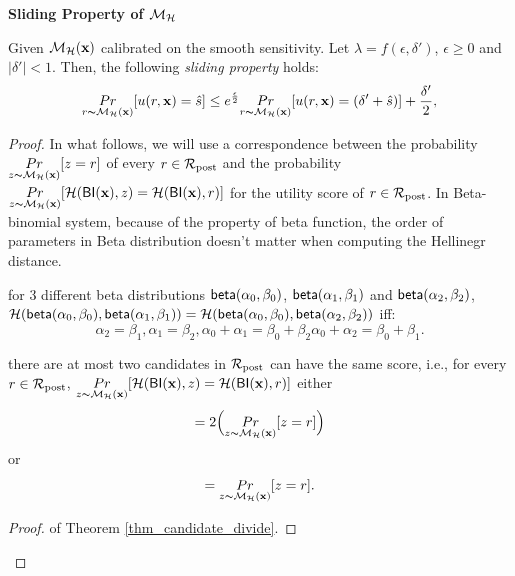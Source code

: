 \documentclass{article}
\begin{document}
\noindent \textbf{Sliding Property of $\mathcal{M}_{\mathcal{H}}$}
\begin{lem}
\label{lem_sliding}
Given $\mathcal{M}_{\mathcal{H}}(\textbf{x})$ calibrated on the smooth sensitivity. Let $\lambda = f(\epsilon,
\delta')$, $\epsilon\geq 0$ and $|\delta'| < 1$. Then, the following \emph{sliding property} holds:
\begin{equation*}
\underset{r \thicksim \mathcal{M}_{\mathcal{H}}(\textbf{x})}{Pr}[u(r,\textbf{x}) = \hat{s}]
\leq
e^{\frac{\epsilon}{2}} \underset{r \thicksim \mathcal{M}_{\mathcal{H}}(\textbf{x})}{Pr}[u(r,\textbf{x}) = (\delta' + \hat{s})] + \frac{\delta'}{2},
\end{equation*}

\end{lem}

\begin{proof}

In what follows, we will use a correspondence between the probability
 $\underset{z \thicksim \mathcal{M}_{\mathcal{H}}(\textbf{x})}{Pr}[z = r]$ of every
 $r\in\mathcal{R}_{\textup{post}}$ and the probability 
 $\underset{z \thicksim \mathcal{M}_{\mathcal{H}}(\textbf{x})}{Pr}[\mathcal{H}(\mathsf{BI}(\textbf{x}),z) =
 \mathcal{H}(\mathsf{BI}(\textbf{x}),r)]$ for the utility score of $r \in \mathcal{R}_{\textup{post}}$. In Beta-binomial system, because of the property of beta function, the order of parameters in Beta distribution doesn't matter when computing the Hellinegr distance. 

 \begin{lem}
 \label{lem_hellinegr_equality}
 for 3 different beta distributions $\mathsf{beta}(\alpha_0, \beta_0)$, $\mathsf{beta}(\alpha_1, \beta_1)$ and $\mathsf{beta}(\alpha_2, \beta_2)$, $\mathcal{H}(\mathsf{beta}(\alpha_0, \beta_0),\mathsf{beta}(\alpha_1, \beta_1)) = \mathcal{H}(\mathsf{beta}(\alpha_0, \beta_0),\mathsf{beta}(\alpha_2, \beta_2))$ iff:
  $$
  \alpha_2 = \beta_1, \alpha_1 = \beta_2, \alpha_0 + \alpha_1 = \beta_0 + \beta_2 \alpha_0 + \alpha_2 = \beta_0 + \beta_1.
  $$
 \end{lem}


 \begin{thm}
 \label{thm_candidate_divide}
 there are at most two candidates in $\mathcal{R}_{\textup{post}}$ can have the same score, i.e., for every $r \in \mathcal{R}_{\textup{post}}$, $\underset{z \thicksim \mathcal{M}_{\mathcal{H}}(\textbf{x})}{Pr}[\mathcal{H}(\mathsf{BI}(\textbf{x}),z) = \mathcal{H}(\mathsf{BI}(\textbf{x}),r)]$ either 
 $$
 = 2\Big ( \underset{z \thicksim \mathcal{M}_{\mathcal{H}}(\textbf{x})}{Pr}[z = r]\Big )
 $$ or 
 $$
 =\underset{z \thicksim \mathcal{M}_{\mathcal{H}}(\textbf{x})}{Pr}[z = r].
 $$
 \end{thm}
 \begin{proof} of Theorem \ref{thm_candidate_divide}.


\end{proof}
\end{proof}
\end{document}
